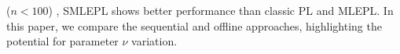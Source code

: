         ($n < 100$)%
        , \acs{SMLEPL} shows better performance than classic \acs{PL} and \acs{MLEPL}. 
        In this paper, we compare the sequential and offline approaches, highlighting the potential for parameter $\nu$ variation. %
        
    \vspace{0.5em}
